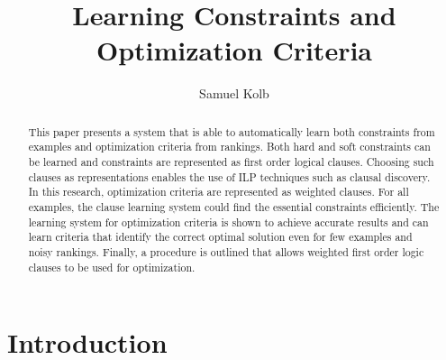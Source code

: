 \documentclass{llncs}
\begin{document}
\title{Learning Constraints and Optimization Criteria}
\author{Samuel Kolb}


\maketitle              %

\begin{abstract}
This paper presents a system that is able to automatically learn both constraints from examples and optimization criteria from rankings.
Both hard and soft constraints can be learned and constraints are represented as first order logical clauses.
Choosing such clauses as representations enables the use of ILP techniques such as clausal discovery.
In this research, optimization criteria are represented as weighted clauses.
For all examples, the clause learning system could find the essential constraints efficiently.
The learning system for optimization criteria is shown to achieve accurate results and can learn criteria that identify the correct optimal solution even for few examples and noisy rankings.
Finally, a procedure is outlined that allows weighted first order logic clauses to be used for optimization.
\end{abstract}

\section{Introduction}

\end{document}
